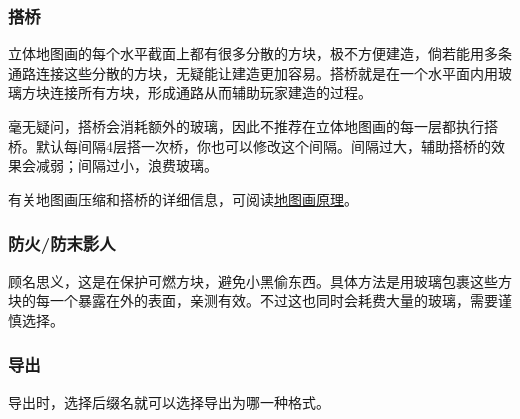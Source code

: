 \documentclass[UTF8]{ctexart}
\begin{document}
    \subsubsection{搭桥}
    立体地图画的每个水平截面上都有很多分散的方块，极不方便建造，倘若能用多条通路连接这些分散的方块，无疑能让建造更加容易。搭桥就是在一个水平面内用玻璃方块连接所有方块，形成通路从而辅助玩家建造的过程。
    
    毫无疑问，搭桥会消耗额外的玻璃，因此不推荐在立体地图画的每一层都执行搭桥。默认每间隔4层搭一次桥，你也可以修改这个间隔。间隔过大，辅助搭桥的效果会减弱；间隔过小，浪费玻璃。
    
    有关地图画压缩和搭桥的详细信息，可阅读\href{https://github.com/ToKiNoBug/SlopeCraftTutorial/blob/main/BasicPrinciple/Principle%20of%20map%20pixel%20arts.md}{地图画原理}。

    \subsubsection{防火/防末影人}
    顾名思义，这是在保护可燃方块，避免小黑偷东西。具体方法是用玻璃包裹这些方块的每一个暴露在外的表面，亲测有效。不过这也同时会耗费大量的玻璃，需要谨慎选择。

    \subsubsection{导出}
    导出时，选择后缀名就可以选择导出为哪一种格式。
\end{document}
